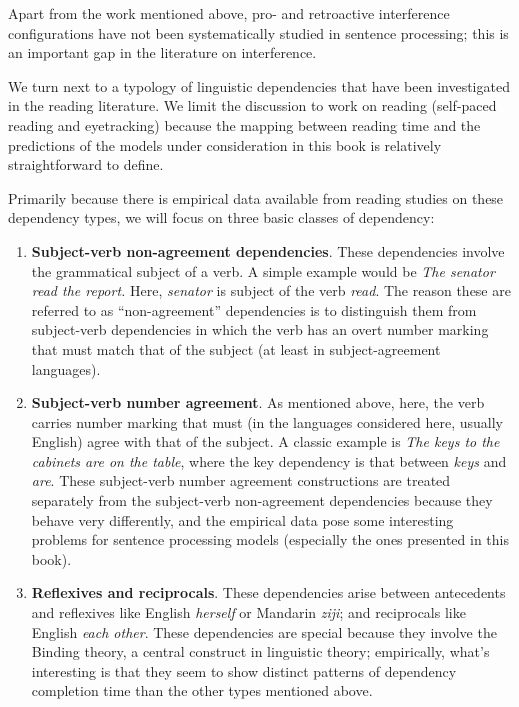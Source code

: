 \documentclass{cambridge7A}\usepackage[]{graphicx}\usepackage[]{color}
\begin{document}
 
Apart from the work mentioned above, pro- and retroactive interference configurations have not been systematically studied in sentence processing; this is an important gap in the literature on interference.  

We turn next to a typology of linguistic dependencies that have been investigated in the reading literature. We limit the discussion to work on reading (self-paced reading and eyetracking) because the mapping between  reading time and the predictions of the models under consideration in this book is relatively straightforward to define.

Primarily because there is empirical data available from reading studies on these dependency types, we will focus on three basic classes of dependency:

\begin{enumerate}
\item \textbf{Subject-verb non-agreement dependencies}. These dependencies involve the grammatical subject of a verb. A simple example would be \textit{The senator read the report.} Here, \textit{senator} is subject of the verb \textit{read}. The reason these are referred to as ``non-agreement'' dependencies is to distinguish them from subject-verb dependencies in which the verb has an overt number marking  that must match that of the subject (at least in subject-agreement languages).  
\item \textbf{Subject-verb number agreement}. As mentioned above, here, the verb carries number marking that must (in the languages considered here, usually English) agree with that of the subject. A classic example is \textit{The keys to the cabinets are on the table}, where the key dependency is that between \textit{keys} and \textit{are}. These subject-verb number agreement constructions are treated separately from the subject-verb non-agreement dependencies because they behave  very differently, and the empirical data pose some interesting problems for sentence processing models (especially the ones presented in this book).
\item 
\textbf{Reflexives and reciprocals}. These dependencies arise between  antecedents and reflexives like English \textit{herself} or Mandarin \textit{ziji}; and reciprocals like English \textit{each other}. These dependencies are special because they involve the Binding theory, a central construct in linguistic theory; empirically, what's interesting is that they seem to show distinct patterns of dependency completion time than the other types mentioned above. 
\end{enumerate}
\end{document}
